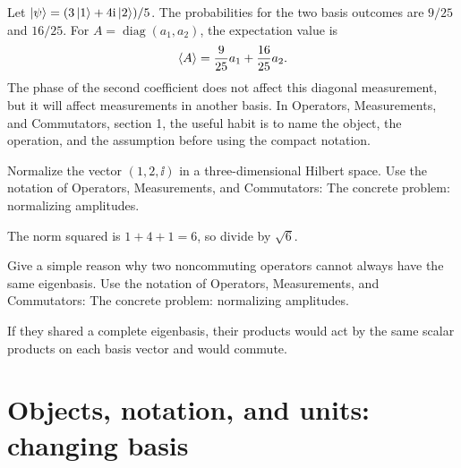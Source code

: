 \begin{example}
Let \(\left|\psi\right\rangle=(3\left|1\right\rangle+4\mathrm i\left|2\right\rangle)/5\).  The probabilities for the two basis outcomes are \(9/25\) and \(16/25\).  For \(A=\operatorname{diag}(a_1,a_2)\), the expectation value is
\[
  \left\langle A\right\rangle=\frac{9}{25}a_1+\frac{16}{25}a_2.
\]
The phase of the second coefficient does not affect this diagonal measurement, but it will affect measurements in another basis.  In Operators, Measurements, and Commutators, section 1, the useful habit is to name the object, the operation, and the assumption before using the compact notation.
\end{example}



\begin{exercise}
Normalize the vector \((1,2,\ii)\) in a three-dimensional Hilbert space.  Use the notation of Operators, Measurements, and Commutators: The concrete problem: normalizing amplitudes.
\begin{answer}
The norm squared is \(1+4+1=6\), so divide by \(\sqrt6\).
\end{answer}
\end{exercise}

\begin{exercise}
Give a simple reason why two noncommuting operators cannot always have the same eigenbasis.  Use the notation of Operators, Measurements, and Commutators: The concrete problem: normalizing amplitudes.
\begin{answer}
If they shared a complete eigenbasis, their products would act by the same scalar products on each basis vector and would commute.
\end{answer}
\end{exercise}



\section{Objects, notation, and units: changing basis}













